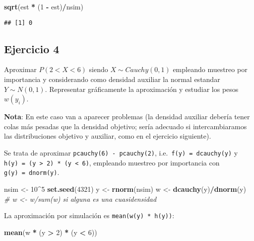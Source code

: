 \documentclass[
]{book}
\newenvironment{Shaded}{\begin{snugshade}}{\end{snugshade}}
\newcommand{\CommentTok}[1]{\textcolor[rgb]{0.56,0.35,0.01}{\textit{#1}}}
\newcommand{\DecValTok}[1]{\textcolor[rgb]{0.00,0.00,0.81}{#1}}
\newcommand{\KeywordTok}[1]{\textcolor[rgb]{0.13,0.29,0.53}{\textbf{#1}}}
\newcommand{\NormalTok}[1]{#1}
\newcommand{\OperatorTok}[1]{\textcolor[rgb]{0.81,0.36,0.00}{\textbf{#1}}}
\newcommand{\StringTok}[1]{\textcolor[rgb]{0.31,0.60,0.02}{#1}}
\theoremstyle{break}
\theoremstyle{definition}
\theoremstyle{definition}
\theoremstyle{definition}
\theoremstyle{remark}
\begin{document}
\begin{Shaded}
\begin{Highlighting}[]
\KeywordTok{sqrt}\NormalTok{(est }\OperatorTok{*}\StringTok{ }\NormalTok{(}\DecValTok{1} \OperatorTok{-}\StringTok{ }\NormalTok{est)}\OperatorTok{/}\NormalTok{nsim)}
\end{Highlighting}
\end{Shaded}

\begin{verbatim}
## [1] 0
\end{verbatim}

\hypertarget{ejercicio-4}{%
\subsection{Ejercicio 4}\label{ejercicio-4}}

Aproximar \(P\left(2<X<6\right)\) siendo \(X\sim Cauchy(0,1)\)
empleando muestreo por importancia y considerando como densidad
auxiliar la normal estandar \(Y\sim N(0,1)\). Representar gráficamente
la aproximación y estudiar los pesos \(w(y_i)\).

\textbf{Nota}: En este caso van a aparecer problemas
(la densidad auxiliar debería tener colas más pesadas que la densidad objetivo;
sería adecuado si intercambiaramos las distribuciones objetivo y auxiliar,
como en el ejercicio siguiente).

Se trata de aproximar \texttt{pcauchy(6)\ -\ pcauchy(2)},
i.e.~\texttt{f(y)\ =\ dcauchy(y)} y \texttt{h(y)\ =\ (y\ \textgreater{}\ 2)\ *\ (y\ \textless{}\ 6)},
empleando muestreo por importancia con \texttt{g(y)\ =\ dnorm(y)}.

\begin{Shaded}
\begin{Highlighting}[]
\NormalTok{nsim <-}\StringTok{ }\DecValTok{10}\OperatorTok{^}\DecValTok{5}
\KeywordTok{set.seed}\NormalTok{(}\DecValTok{4321}\NormalTok{)}
\NormalTok{y <-}\StringTok{ }\KeywordTok{rnorm}\NormalTok{(nsim)}
\NormalTok{w <-}\StringTok{ }\KeywordTok{dcauchy}\NormalTok{(y)}\OperatorTok{/}\KeywordTok{dnorm}\NormalTok{(y) }\CommentTok{# w <- w/sum(w) si alguna es una cuasidensidad}
\end{Highlighting}
\end{Shaded}

La aproximación por simulación es \texttt{mean(w(y)\ *\ h(y))}:

\begin{Shaded}
\begin{Highlighting}[]
\KeywordTok{mean}\NormalTok{(w }\OperatorTok{*}\StringTok{ }\NormalTok{(y }\OperatorTok{>}\StringTok{ }\DecValTok{2}\NormalTok{) }\OperatorTok{*}\StringTok{ }\NormalTok{(y }\OperatorTok{<}\StringTok{ }\DecValTok{6}\NormalTok{)) }
\end{Highlighting}
\end{Shaded}
\end{document}
